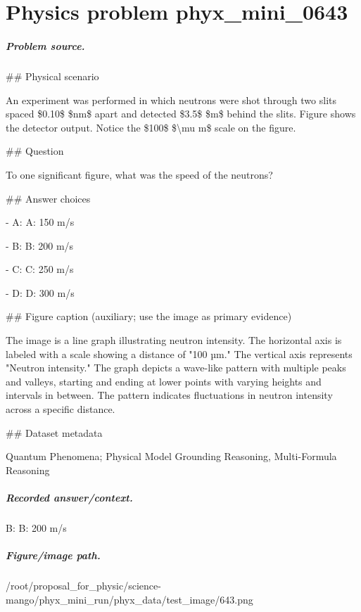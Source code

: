 
\chapter{Physics problem phyx\_mini\_0643}
\label{ch:PhyXMiniProblems_problem_phyx_mini_0643}

\paragraph{Problem source.}
\#\# Physical scenario

An experiment was performed in which neutrons were shot through two slits spaced \$0.10\$ \$nm\$ apart and detected \$3.5\$ \$m\$ behind the slits. Figure shows the detector output. Notice the \$100\$ \$\textbackslash{}mu m\$ scale on the figure.

\#\# Question

To one significant figure, what was the speed of the neutrons?

\#\# Answer choices

- A: A: 150 m/s

- B: B: 200 m/s

- C: C: 250 m/s

- D: D: 300 m/s

\#\# Figure caption (auxiliary; use the image as primary evidence)

The image is a line graph illustrating neutron intensity. The horizontal axis is labeled with a scale showing a distance of "100 µm." The vertical axis represents "Neutron intensity." The graph depicts a wave-like pattern with multiple peaks and valleys, starting and ending at lower points with varying heights and intervals in between. The pattern indicates fluctuations in neutron intensity across a specific distance.

\#\# Dataset metadata

Quantum Phenomena; Physical Model Grounding Reasoning, Multi-Formula Reasoning

\paragraph{Recorded answer/context.}
B: B: 200 m/s

\paragraph{Figure/image path.}
/root/proposal\_for\_physic/science-mango/phyx\_mini\_run/phyx\_data/test\_image/643.png

